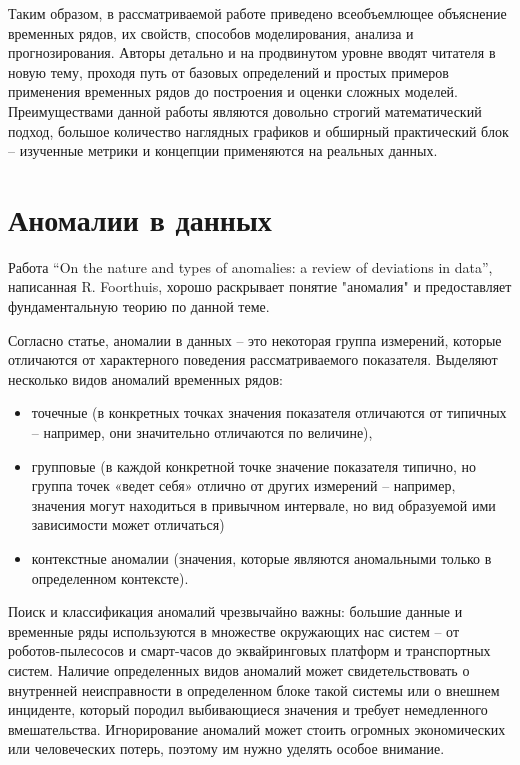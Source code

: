 \documentclass[14pt, letterpaper]{extarticle}
\begin{document}
Таким образом, в рассматриваемой работе приведено всеобъемлющее объяснение временных рядов, их свойств, способов моделирования, анализа и прогнозирования. Авторы детально и на продвинутом уровне вводят читателя в новую тему, проходя путь от базовых определений и простых примеров применения временных рядов до построения и оценки сложных моделей.
Преимуществами данной работы являются довольно строгий математический подход, большое количество наглядных графиков и обширный практический блок – изученные метрики и концепции применяются на реальных данных.

\section{Аномалии в данных}

Работа “On the nature and types of anomalies: a review of deviations in data”, написанная R. Foorthuis, \cite{foorthuis2021nature} хорошо раскрывает понятие "аномалия" и предоставляет фундаментальную теорию по данной теме. 

Согласно статье, аномалии в данных – это некоторая группа измерений, которые отличаются от характерного поведения рассматриваемого показателя. Выделяют несколько видов аномалий временных рядов:
\begin{itemize}
    \item точечные (в конкретных точках значения показателя отличаются от типичных – например, они значительно отличаются по величине), 
    \item групповые (в каждой конкретной точке значение показателя типично, но группа точек «ведет себя» отлично от других измерений – например, значения могут находиться в привычном интервале, но вид образуемой ими зависимости может отличаться)
    \item контекстные аномалии (значения, которые являются аномальными только в определенном контексте). 
 \end{itemize}
 
Поиск и классификация аномалий чрезвычайно важны: большие данные и временные ряды используются в множестве окружающих нас систем – от роботов-пылесосов и смарт-часов до эквайринговых платформ и транспортных систем. Наличие определенных видов аномалий может свидетельствовать о внутренней неисправности в определенном блоке такой системы или о внешнем инциденте, который породил выбивающиеся значения и требует немедленного вмешательства. Игнорирование аномалий может стоить огромных экономических или человеческих потерь, поэтому им нужно уделять особое внимание.
\end{document}
